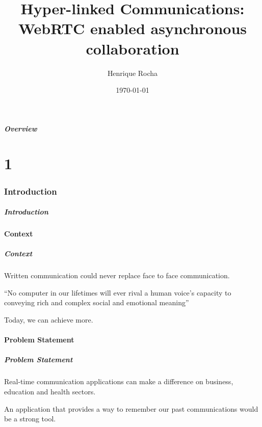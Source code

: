 \documentclass[t]{beamer}
\title[Hyper-linked Communications]{Hyper-linked Communications: WebRTC enabled
asynchronous collaboration} %
\author{Henrique Rocha} %
\institute[IST] %
{
Instituto Superior Técnico \\
Universidade de Lisboa \\ %
\medskip
\textit{henrique.rocha@tecnico.ulisboa.pt} %
}
\date{\today} %
\newcommand{\nologo}{\setbeamertemplate{logo}{}}
\newcommand{\myquote}[2]{\begin{exampleblock}{}{\large ``#1''}\vskip5mm\hspace*\fill{\small--- #2}\end{exampleblock}}
\begin{document}
{
\begin{frame}
\titlepage %
\end{frame}
}

\begin{frame}[t,allowframebreaks]
\frametitle{Overview} 
\tableofcontents[part=1]
\framebreak
\tableofcontents[part=2]
\end{frame}


\part{1}
\section{Introduction}\label{intro}

\begin{frame}[t,shrink]
\frametitle{Introduction} 
\tableofcontents[part=1,currentsection,hideothersubsections]
\tableofcontents[part=2,currentsection,hideothersubsections]
\end{frame}

	\subsection{Context}   %
		\begin{frame}[c]
		\frametitle{Context}
		Written communication could never replace face to face communication.

		\myquote{No computer in our lifetimes will ever rival a human voice's capacity to conveying rich and complex social and emotional meaning}{Geddes, Martin}

		Today, we can achieve more.
		\end{frame}

	\subsection{Problem Statement} %
  		\begin{frame}[c]
		\frametitle{Problem Statement}
		Real-time communication applications can make a difference on business, education and health sectors.

		\vfill

		An application that provides a way to remember our past communications would be a strong tool.
		\end{frame}
\end{document}
